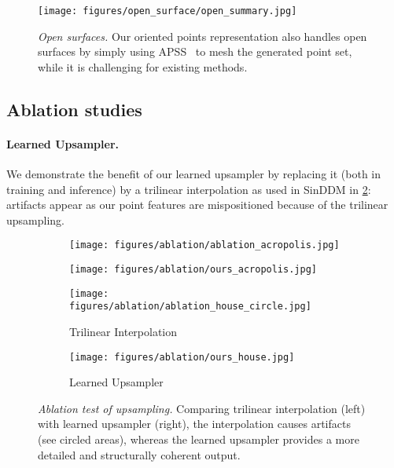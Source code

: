 \begin{figure}[!h] \vspace*{-2.5mm} \centering
  \texttt{[image: figures/open\_surface/open\_summary.jpg]}
  \vspace*{-3mm}
    \caption{\emph{Open surfaces.} Our oriented points representation also handles open surfaces by simply using APSS~\cite{guennebaud_algebraic_2007} to mesh the generated point set, while it is challenging for existing methods.\vspace*{-3mm}}
    \label{fig:opensurfaces}
\end{figure}

\subsection{Ablation studies}\label{sec:ablation}
\paragraph{Learned Upsampler.}
We demonstrate the benefit of our learned upsampler by replacing it (both in training and inference) by a trilinear interpolation as used in SinDDM in \cref{fig:ablation_upsampler}: artifacts appear as our point features are mispositioned because of the trilinear upsampling.

\begin{figure}[!h] 
    \centering
    \centering
    \begin{subfigure}{.48\linewidth}
      \centering
      \texttt{[image: figures/ablation/ablation\_acropolis.jpg]}
    \end{subfigure}
     \begin{subfigure}{.48\linewidth}
      \centering
      \texttt{[image: figures/ablation/ours\_acropolis.jpg]}
    \end{subfigure}

    \centering
    \begin{subfigure}{.48\linewidth}
      \centering
      \texttt{[image: figures/ablation/ablation\_house\_circle.jpg]}
      \caption{Trilinear Interpolation}
    \end{subfigure}
     \begin{subfigure}{.48\linewidth}
      \centering
      \texttt{[image: figures/ablation/ours\_house.jpg]}
      \caption{Learned Upsampler}
    \end{subfigure}
    \vspace*{-2mm}
    \caption{\emph{Ablation test of upsampling.} Comparing trilinear interpolation (left) with learned upsampler (right), the interpolation causes artifacts (see circled areas), whereas the learned upsampler provides a more detailed and structurally coherent output.\vspace*{-4mm}}
    \label{fig:ablation_upsampler}
\end{figure}

